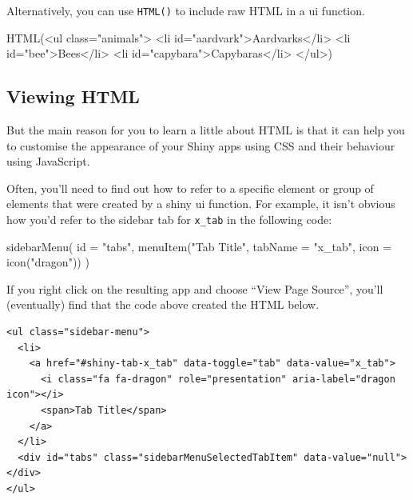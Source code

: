 \documentclass[
]{book}
\newenvironment{Shaded}{\begin{snugshade}}{\end{snugshade}}
\newcommand{\AttributeTok}[1]{\textcolor[rgb]{0.77,0.63,0.00}{#1}}
\newcommand{\FunctionTok}[1]{\textcolor[rgb]{0.00,0.00,0.00}{#1}}
\newcommand{\NormalTok}[1]{#1}
\newcommand{\StringTok}[1]{\textcolor[rgb]{0.31,0.60,0.02}{#1}}
\begin{document}
Alternatively, you can use \texttt{HTML()} to include raw HTML in a ui function.

\begin{Shaded}
\begin{Highlighting}[]
\FunctionTok{HTML}\NormalTok{(}\StringTok{\textquotesingle{}\textless{}ul class="animals"\textgreater{}}
\StringTok{    \textless{}li id="aardvark"\textgreater{}Aardvarks\textless{}/li\textgreater{}}
\StringTok{    \textless{}li id="bee"\textgreater{}Bees\textless{}/li\textgreater{}}
\StringTok{    \textless{}li id="capybara"\textgreater{}Capybaras\textless{}/li\textgreater{}}
\StringTok{\textless{}/ul\textgreater{}\textquotesingle{}}\NormalTok{)}
\end{Highlighting}
\end{Shaded}

\hypertarget{viewing-html}{%
\subsection{Viewing HTML}\label{viewing-html}}

But the main reason for you to learn a little about HTML is that it can help you to customise the appearance of your Shiny apps using CSS and their behaviour using JavaScript.

Often, you'll need to find out how to refer to a specific element or group of elements that were created by a shiny ui function. For example, it isn't obvious how you'd refer to the sidebar tab for \texttt{x\_tab} in the following code:

\begin{Shaded}
\begin{Highlighting}[]
\FunctionTok{sidebarMenu}\NormalTok{(}
    \AttributeTok{id =} \StringTok{"tabs"}\NormalTok{,}
    \FunctionTok{menuItem}\NormalTok{(}\StringTok{"Tab Title"}\NormalTok{, }\AttributeTok{tabName =} \StringTok{"x\_tab"}\NormalTok{, }\AttributeTok{icon =} \FunctionTok{icon}\NormalTok{(}\StringTok{"dragon"}\NormalTok{))}
\NormalTok{)}
\end{Highlighting}
\end{Shaded}

If you right click on the resulting app and choose ``View Page Source'', you'll (eventually) find that the code above created the HTML below.

\begin{verbatim}
<ul class="sidebar-menu">
  <li>
    <a href="#shiny-tab-x_tab" data-toggle="tab" data-value="x_tab">
      <i class="fa fa-dragon" role="presentation" aria-label="dragon icon"></i>
      <span>Tab Title</span>
    </a>
  </li>
  <div id="tabs" class="sidebarMenuSelectedTabItem" data-value="null"></div>
</ul>
\end{verbatim}
\end{document}
